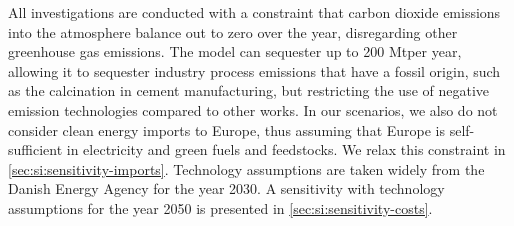 All investigations are conducted with a constraint that carbon dioxide emissions
into the atmosphere balance out to zero over the year, disregarding other
greenhouse gas emissions. The model can sequester up to 200 Mt\co per year,
allowing it to sequester industry process emissions that have a fossil origin,
such as the calcination in cement manufacturing, but restricting the use of
negative emission technologies compared to other works.
\cite{blancoPotentialHydrogen2018} In our scenarios, we also do not consider
clean energy imports to Europe, thus assuming that Europe is self-sufficient in
electricity and green fuels and feedstocks. We relax this constraint in
\cref{sec:si:sensitivity-imports}. Technology assumptions are taken widely from
the Danish Energy Agency for the year 2030.\cite{DEA} A sensitivity with
technology assumptions for the year 2050 is presented in \cref{sec:si:sensitivity-costs}.

